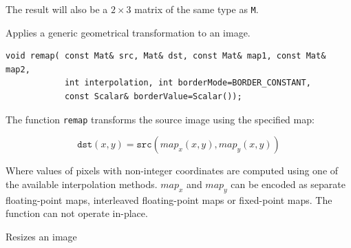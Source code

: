 The result will also be a $2 \times 3$ matrix of the same type as \texttt{M}.

\label{remap}
Applies a generic geometrical transformation to an image.

\begin{lstlisting}
void remap( const Mat& src, Mat& dst, const Mat& map1, const Mat& map2,
            int interpolation, int borderMode=BORDER_CONSTANT,
            const Scalar& borderValue=Scalar());
\end{lstlisting}
\begin{description}
\end{description}

The function \texttt{remap} transforms the source image using the specified map:

\[
\texttt{dst}(x,y) = \texttt{src}(map_x(x,y),map_y(x,y))
\]

Where values of pixels with non-integer coordinates are computed using one of the available interpolation methods. $map_x$ and $map_y$ can be encoded as separate floating-point maps, interleaved floating-point maps or fixed-point maps.
The function can not operate in-place.

\label{resize}
Resizes an image

